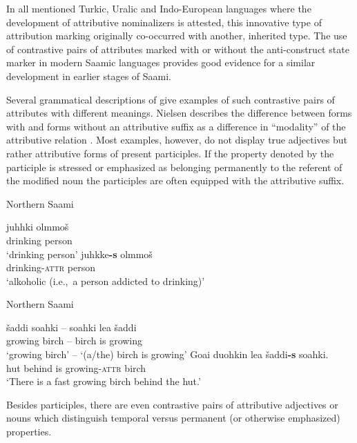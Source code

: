 {In all mentioned Turkic, Uralic and Indo-European languages where the development of attributive nominalizers is attested, this innovative type of attribution marking originally co-occurred with another, inherited type. The use of contrastive pairs of attributes marked with or without the anti\hyp{}construct state marker in modern Saamic languages provides good evidence for a similar development in earlier stages of Saami.

Several grammatical descriptions of  give examples of such contrastive pairs of attributes with different meanings. Nielsen describes the difference between forms with and forms without an attributive suffix as a difference in “modality” of the attributive relation \cite[203]{nielsen1945b}. Most examples, however, do not display true adjectives but rather attributive forms of present participles. If the property denoted by the participle is stressed or emphasized as belonging permanently to the referent of the modified noun the participles are often equipped with the attributive suffix.
\begin{exe}
\ex
\begin{xlist}
\ex \rm{Northern Saami \citep[204]{nielsen1945b}}
\begin{xlist}
\ex
\gll 	juhhki olmmoš\\
	drinking person\\
\glt	 ‘drinking person’
\ex	
\gll	juhkke\textbf{-s} olmmoš\\
	drinking-\textsc{attr} person\\
\glt	‘alkoholic (i.e.,~a person addicted to drinking)’
\end{xlist}
\ex \rm{Northern Saami \citep[282]{bartens1989}}
\begin{xlist}
\ex 	
\gll	šaddi soahki – soahki lea šaddi\\
 	growing birch – birch is growing\\
\glt	‘growing birch’ – ‘(a/the) birch is growing’
\ex
\gll	Goa{\dj}i duohkin lea šaddi\textbf{-s} soahki.\\
	hut behind is growing-\textsc{attr} birch\\
\glt	‘There is a fast growing birch behind the hut.’
\end{xlist}
\end{xlist}
\end{exe}
Besides participles, there are even contrastive pairs of attributive adjectives or nouns which distinguish temporal versus permanent (or otherwise emphasized) properties.
}
